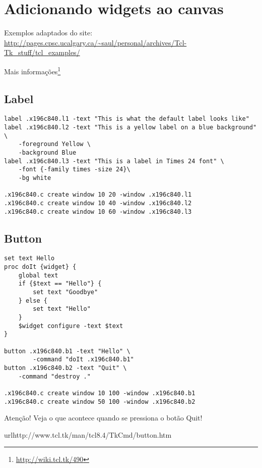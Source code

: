 \section{Adicionando widgets ao canvas}

Exemplos adaptados do site: \url{http://pages.cpsc.ucalgary.ca/~saul/personal/archives/Tcl-Tk_stuff/tcl_examples/}

Mais informações\footnote{\url{http://wiki.tcl.tk/490}}

\subsection{Label}

\begin{lstlisting}
label .x196c840.l1 -text "This is what the default label looks like"
label .x196c840.l2 -text "This is a yellow label on a blue background" \
    -foreground Yellow \
    -background Blue
label .x196c840.l3 -text "This is a label in Times 24 font" \
    -font {-family times -size 24}\
    -bg white

.x196c840.c create window 10 20 -window .x196c840.l1
.x196c840.c create window 10 40 -window .x196c840.l2
.x196c840.c create window 10 60 -window .x196c840.l3
\end{lstlisting}

\subsection{Button}

\begin{lstlisting}
set text Hello
proc doIt {widget} {
    global text
    if {$text == "Hello"} {
        set text "Goodbye"
    } else {
        set text "Hello"
    }
    $widget configure -text $text
}

button .x196c840.b1 -text "Hello" \
        -command "doIt .x196c840.b1"
button .x196c840.b2 -text "Quit" \
    -command "destroy ."

.x196c840.c create window 10 100 -window .x196c840.b1
.x196c840.c create window 50 100 -window .x196c840.b2
\end{lstlisting}

Atenção! Veja o que acontece quando se pressiona o botão Quit!

url{http://www.tcl.tk/man/tcl8.4/TkCmd/button.htm}
